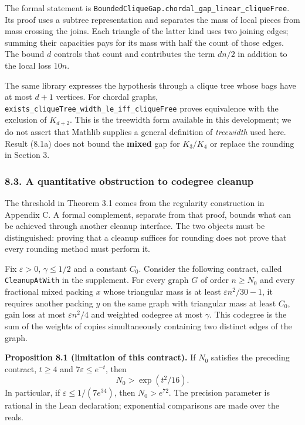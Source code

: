 \documentclass[english,11pt,a4paper]{article}
\begin{document}
The formal statement is \nolinkurl{BoundedCliqueGap.chordal_gap_linear_cliqueFree}. Its proof uses a subtree representation and separates the mass of local pieces from mass crossing the joins. Each triangle of the latter kind uses two joining edges; summing their capacities pays for its mass with half the count of those edges. The bound \(d\) controls that count and contributes the term \(dn/2\) in addition to the local loss \(10n\).

The same library expresses the hypothesis through a clique tree whose bags have at most \(d+1\) vertices. For chordal graphs, \nolinkurl{exists_cliqueTree_width_le_iff_cliqueFree} proves equivalence with the exclusion of \(K_{d+2}\). This is the treewidth form available in this development; we do not assert that Mathlib supplies a general definition of \emph{treewidth} used here. Result (8.1a) does not bound the \textbf{mixed} gap for \(K_3/K_4\) or replace the rounding in Section 3.

\subsubsection{8.3. A quantitative obstruction to codegree cleanup}\label{a-quantitative-obstruction-to-codegree-cleanup}

The threshold in Theorem 3.1 comes from the regularity construction in Appendix C. A formal complement, separate from that proof, bounds what can be achieved through another cleanup interface. The two objects must be distinguished: proving that a cleanup suffices for rounding does not prove that every rounding method must perform it.

Fix \(\varepsilon>0\), \(\gamma\le1/2\) and a constant \(C_0\). Consider the following contract, called \nolinkurl{CleanupAtWith} in the supplement. For every graph \(G\) of order \(n\ge N_0\) and every fractional mixed packing \(x\) whose triangular mass is at least \(\varepsilon n^2/30-1\), it requires another packing \(y\) on the same graph with triangular mass at least \(C_0\), gain loss at most \(\varepsilon n^2/4\) and weighted codegree at most \(\gamma\). This codegree is the sum of the weights of copies simultaneously containing two distinct edges of the graph.


\textbf{Proposition 8.1 (limitation of this contract).} If \(N_0\) satisfies the preceding contract, \(t\ge4\) and \(7\varepsilon\le e^{-t}\), then \[
N_0>\exp(t^2/16).
\tag{8.2}
\] In particular, if \(\varepsilon\le1/(7e^{34})\), then \(N_0>e^{72}\). The precision parameter is rational in the Lean declaration; exponential comparisons are made over the reals.
\end{document}
